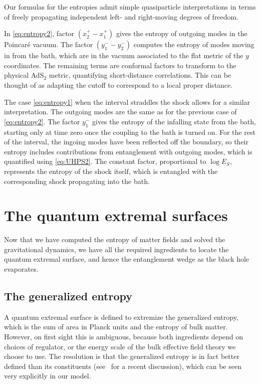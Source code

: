 \documentclass[12pt]{article}
\begin{document}
Our formulas for the entropies admit simple quasiparticle interpretations in terms of freely propagating independent left- and right-moving degrees of freedom.

In \eqref{eq:entropy2}, factor $(x^+_{2}-x^+_{1})$ gives the entropy of outgoing modes in the Poincar\'e vacuum. The factor $(y^-_{1}-y^-_{2})$ computes the entropy of modes moving in from the bath, which are in the vacuum associated to the flat metric of the $y$ coordinates. The remaining terms are conformal factors to transform to the physical AdS$_2$ metric, quantifying short-distance correlations. This can be thought of as adapting the cutoff to correspond to a local proper distance.

The case \eqref{eq:entropy1} when the interval straddles the shock allows for a similar interpretation. The outgoing modes are the same as for the previous case of \eqref{eq:entropy2}. The factor $y^-_{1}$ gives the entropy of the infalling state from the bath, starting only at time zero once the coupling to the bath is turned on. For the rest of the interval, the ingoing modes have been reflected off the boundary, so their entropy includes contributions from entanglement with outgoing modes, which is quantified using \eqref{eq:UHPS2}. The constant factor, proportional to $\log E_S$, represents the entropy of the shock itself, which is entangled with the corresponding shock propagating into the bath.



\section{The quantum extremal surfaces}\label{sec:QES}

Now that we have computed the entropy of matter fields and solved the gravitational dynamics, we have all the required ingredients to locate the quantum extremal surface, and hence the entanglement wedge as the black hole evaporates.

\subsection{The generalized entropy}

A quantum extremal surface is defined to extremize the generalized entropy, which is the sum of area in Planck units and the entropy of bulk matter. However, on first sight this is ambiguous, because both ingredients depend on choices of regulator, or the energy scale of the bulk effective field theory we choose to use. The resolution is that the generalized entropy is in fact better defined than its constituents (see~\cite{Bousso:2015mna} for a recent discussion), which can be seen very explicitly in our model.
\end{document}
